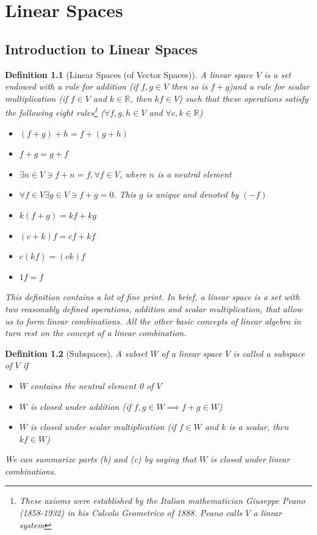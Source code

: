 \documentclass[10pt]{report}
\newtheorem{def2}{Definition}[section]
\begin{document}
\chapter{Linear Spaces}
\section{Introduction to Linear Spaces}
\begin{def2}[Linear Spaces (of Vector Spaces)]
A linear space $V$ is a set endowed with a rule for addition (if $f, g\in V$ then so is $f + g$)and a rule for scalar multiplication (if $f\in V$ and $k\in \mathbb{R}$, then $kf\in V$) such that these operations satisfy the following eight rules\footnote{These axioms were established by the Italian mathematician Giuseppe Peano (1858-1932) in his \textit{Calcolo Geometrico} of 1888. Peano calls $V$ a linear system} ($\forall f, g, h\in V$ and $\forall c, k \in \mathbb{R}$)
\begin{itemize}
\item[1.] $(f + g) + h= f+(g+h)$
\item[2.] $f+g=g+f$
\item[3.] $\exists n\in V\ni f+n = f, \forall f\in V$, where $n$ is a neutral element
\item[4.] $\forall f\in V\exists g\in V \ni f+g=0$. This $g$ is unique and denoted by $(-f)$
\item[5.] $k(f+g)=kf+kg$
\item[6.] $(c+k)f=cf+kf$
\item[7.] $c(kf)=(ck)f$
\item[8.] $1f=f$
\end{itemize} 
This definition contains a lot of fine print. In brief, a linear space is a set with two reasonably defined operations, addition and scalar multiplication, that allow us to form linear combinations. All the other basic concepts of linear algebra in turn rest on the concept of a linear combination.
\end{def2}
\begin{def2}[Subspaces]
A subset $W$ of a linear space $V$ is called a subspace of $V$ if
\begin{itemize}
\item[a.] $W$ contains the neutral element 0 of $V$
\item[b.] $W$ is closed under addition (if $f, g\in W\implies f+g\in W$)
\item[c.] $W$ is closed under scalar multiplication (if $f\in W$ and $k$ is a scalar, then $kf\in W$)
\end{itemize}
We can summarize parts (b) and (c) by saying that $W$ is closed under linear combinations.
\end{def2}
\end{document}
